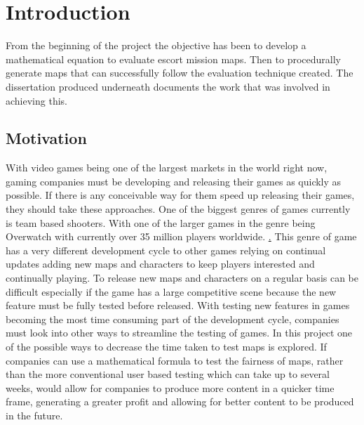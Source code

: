 \documentclass{article}
\begin{document}
\title{{}}
\author{Adam Blance}

\maketitle

\begin{abstract}
The abstract text goes here.
\end{abstract}
\newpage
\renewcommand{\abstractname}{Acknowledgements}
\begin{abstract}
Shout out to my bois 
\end{abstract}
\newpage
\section{Introduction}
From the beginning of the project the objective has been to develop a mathematical equation to evaluate escort mission maps. Then to procedurally generate maps that can successfully follow the evaluation technique created. The dissertation produced underneath documents the work that was involved in achieving this.
\subsection{Motivation}
With video games being one of the largest markets in the world right now, gaming companies must be developing and releasing their games as quickly as possible. If there is any conceivable way for them speed up releasing their games, they should take these approaches.
\vspace{5mm} 
\newline  
One of the biggest genres of games currently is team based shooters. With one of the larger games in the genre being Overwatch with currently over 35 million players worldwide. \href{https://twitter.com/PlayOverwatch/status/919925924769906688}. This genre of game has a very different development cycle to other games relying on continual updates adding new maps and characters to keep players interested and continually playing. To release new maps and characters on a regular basis can be difficult especially if the game has a large competitive scene because the new feature \vspace{5mm} must be fully tested before released.
\newline  
With testing new features in games becoming the most time consuming part of the development cycle, companies must look into other ways to streamline the testing of games. In this project one of the possible ways to decrease the time taken to test maps is explored. If companies can use a mathematical formula to test the fairness of maps, rather than the more conventional user based testing which can take up to several weeks, would allow for companies to produce more content in a quicker time frame, generating a greater profit and allowing for better content to be produced in the future. 
\end{document}
